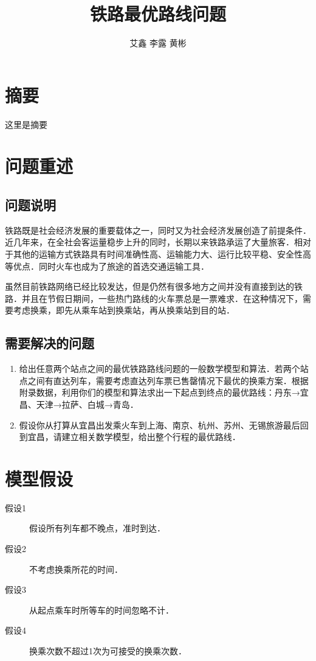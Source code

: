 \documentclass[UTF8]{ctexart}
\begin{document}
\title{铁路最优路线问题}
\author{艾鑫 李露 黄彬}
\maketitle

\section{摘要}
这里是摘要
\newpage

\section{问题重述}
\subsection{问题说明}
铁路既是社会经济发展的重要载体之一，同时又为社会经济发展创造了前提条件．近几年来，在全社会客运量稳步上升的同时，长期以来铁路承运了大量旅客．相对于其他的运输方式铁路具有时间准确性高、运输能力大、运行比较平稳、安全性高等优点．同时火车也成为了旅途的首选交通运输工具．

虽然目前铁路网络已经比较发达，但是仍然有很多地方之间并没有直接到达的铁路．并且在节假日期间，一些热门路线的火车票总是一票难求．在这种情况下，需要考虑换乘，即先从乘车站到换乘站，再从换乘站到目的站．

\subsection{需要解决的问题}
\begin{enumerate}
  \item 给出任意两个站点之间的最优铁路路线问题的一般数学模型和算法．若两个站点之间有直达列车，需要考虑直达列车票已售罄情况下最优的换乘方案．根据附录数据，利用你们的模型和算法求出一下起点到终点的最优路线：丹东→宜昌、天津→拉萨、白城→青岛．
  \item 假设你从打算从宜昌出发乘火车到上海、南京、杭州、苏州、无锡旅游最后回到宜昌，请建立相关数学模型，给出整个行程的最优路线．
\end{enumerate}

\section{模型假设}
\begin{description}
  \item[假设1] 假设所有列车都不晚点，准时到达．
  \item[假设2] 不考虑换乘所花的时间．
  \item[假设3] 从起点乘车时所等车的时间忽略不计．
  \item[假设4] 换乘次数不超过1次为可接受的换乘次数．
\end{description}
\end{document}
